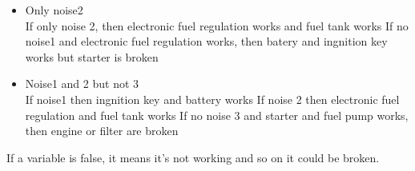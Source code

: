 \documentclass[paper=a4, fontsize=11pt]{scrartcl} %
\numberwithin{equation}{section} %
\numberwithin{figure}{section} %
\numberwithin{table}{section} %
\begin{document}
\begin{itemize}
\begin{itemize}
			\item Only noise2\\	
				If only noise 2, then electronic fuel regulation works and fuel tank works
				If no noise1 and electronic fuel regulation works, then batery and ingnition key works but starter is broken
			\item Noise1 and 2 but not 3\\
				If noise1 then ingnition key and battery works
				If noise 2 then electronic fuel regulation and fuel tank works 
				If no noise 3 and starter and fuel pump works, then engine or filter are broken
			
			
		\end{itemize}

\end{itemize}

If a variable is false, it means it's not working and so on it could be broken.




\end{document}
